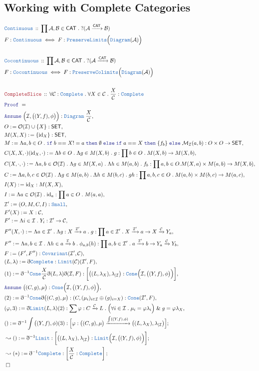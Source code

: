 \documentclass[12pt]{scrartcl}
\newcommand{\TYPE}[1]{\textcolor{NavyBlue}{\mathtt{#1}}}
\newcommand{\LOGIC}[1]{\textcolor{Blue}{\mathtt{#1}}}
\newcommand{\THM}[1]{\textcolor{Maroon}{\mathtt{#1}}}
\renewcommand{\.}{\; . \;}
\newcommand{\de}{: \kern 0.1pc =}
\newcommand{\If}{\LOGIC{if} \;}
\newcommand{\Then}{ \; \LOGIC{then} \;}
\newcommand{\Else}{\; \LOGIC{else} \;}
\newcommand{\Theorem}[2]{& \THM{#1} \, :: \, #2 \\ & \Proof = \\ }
\newcommand{\DeclareType}[2]{& \TYPE{#1} \, :: \, #2 \\}
\newcommand{\DefineType}[3]{& #1 : \TYPE{#2} \iff #3 \\}
\newcommand{\Page}[1]{ \begin{align*} #1 \end{align*}   }
\newcommand{ \bd }{ \ByDef }
\renewcommand{\And}{\; \& \;}
\DeclareMathOperator*{\id}{id}
\newcommand{\Mor}{\mathcal{M}}
\newcommand{\Obj}{\mathcal{O}}
\newcommand{\Arrow}{\xrightarrow}
\newcommand{\Say}[3]{& #1 \de #2 : #3, \\}
\newcommand{\Conclude}[3]{& #1 \de #2 : #3; \\}
\newcommand{\DeriveConclude}[3]{& \leadsto #1 \de #2 : #3 ; \\}
\newcommand{\Assume}[2]{& \LOGIC{Assume} \; #1 : #2, \\}
\newcommand{\QED}{\; \square}
\newcommand{\EndProof}{& \QED \\}
\newcommand{\ByDef}{\eth}
\newcommand{\Proof}{\LOGIC{Proof} \; }
\newcommand{\Cov}{\TYPE{Covariant}}
\newcommand{\C}{\mathcal{C}}
\newcommand{\A}{\mathcal{A}}
\newcommand{\B}{\mathcal{B}}
\newcommand{\I}{\mathcal{I}}
\newcommand{\CAT}{\mathsf{CAT}}
\newcommand{\SET}{\mathsf{SET}}
\begin{document}
\subsection{Working with Complete Categories}
\Page{ 
	\DeclareType{Continuous}{\prod \A,\B \in \CAT \. ?(\A \Arrow{\CAT} \B)}
	\DefineType{ F   }{Continuous}{F : \TYPE{PreserveLimits}\Big( \TYPE{Diagram}(\A)  \Big)}
	\\
	\DeclareType{Cocontinuous}{\prod \A,\B \in \CAT \. ?(\A \Arrow{\CAT} \B)}
	\DefineType{F}{Cocontinuous}{F : \TYPE{PreserveColimits}\Big( \TYPE{Diagram}(\A) \Big)}
	\\
	\Theorem{CompleteSlice}{\forall \C : \TYPE{Complete} \.  \forall X \in \C \.  \frac{X}{\C} : \TYPE{Complete}}
	\Assume{\Big(\I,\big((Y,f),\phi\big)\Big)}{\TYPE{Diagram}\;\frac{X}{\C}}
	\Say{O}{ \Obj(\I) \cup \{X\}}{\SET}
	\Say{M(X,X)}{\{{\id}_X\}}{\SET}
	\Say{M}{ \Lambda a,b \in O \. \If b == X != a  \Then \emptyset \Else \If a == X \Then \{f_b\} \Else \Mor_{\I}(a,b) }
	{ O \times O \to \SET  }
	\Say{C(X,X,\cdot)({\id}_X,\cdot)}{\Lambda b \in O \. \Lambda g \in M(X,b) \. g }{\prod b \in O \.  M(X,b) \to M(X,b)}
	\Say{C(X,\cdot,\cdot)}{\Lambda a,b \in \Obj(\I) \. \Lambda g \in M(X,a) \. \Lambda h \in M(a,b) \.  f_b}
	{\prod a,b \in O . M(X,a) \times M(a,b) \to M(X,b)}
	\Say{C}{\Lambda a,b,c \in \Obj(\I) \. \Lambda g \in M(a,b) \. \Lambda h \in M(b,c) \. gh}
	{\prod a,b,c \in O \. M(a,b) \times M(b,c) \to M(a,c)}
	\Say{I(X)}{{\id}_X}{M(X,X)}
	\Say{I}{ \Lambda a \in \Obj(\I) \.{\id}_a  }{\prod a \in O \. M(a,a)}
	\Say{\I'}{(O,M,C,I)}{\TYPE{Small}}
	\Say{F'(X)}{X}{\C}
	\Say{F'}{\Lambda i \in \I \. Y_i}{\I' \to \C}
	\Say{F''(X,\cdot)}{\Lambda a \in \I' \. \Lambda g : X \Arrow{\I'} a \. g }
	{ \prod a \in \I' \. X \Arrow{\I'} a \to X \Arrow{\C} Y_a   }
	\Say{F''}{\Lambda a,b \in \I \. \Lambda h \in a \Arrow{\I} b \. \phi_{a,b}(h)}
	{\prod a,b \in \I' \. a \Arrow{\I'} b \to Y_a \Arrow{\C} Y_b}
	\Say{F}{(F',F'')}{\Cov(\I',\C)}
	\Say{(L,\lambda)}{\bd \TYPE{Complete}}{\TYPE{Limit}(\C)(\I',F)}
	\Say{(1)}{\bd^{-1}\TYPE{Cone} \frac{X}{\C} \bd(L,\lambda) \bd(\I,F)}
	{\bigg[ \big((L,\lambda_X),\lambda_{|\I}\big) :  \TYPE{Cone}\Big(\I,\big((Y,f),\phi\big)\Big)  \bigg]}
	\Assume{\big((C,g),\mu\big)}{\TYPE{Cone}\Big(\I,\big( (Y,f),\phi\big) \Big)}
	\Say{(2)}{\bd^{-1} \TYPE{Cone} \bd \big((C,g),\mu\big)}
	{(C,(\mu_i)_{i \in \I} \oplus (g)_{i=X} ) : \TYPE{Cone}(\I',F) }
	\Say{(\varphi,3)}{\bd \TYPE{Limit}(L,\lambda)(2)}
	{  \sum \varphi : C \Arrow{\C} L \. 
		\Big(\forall i \in \I \. \mu_i = \varphi \lambda_i \Big) \And g = \varphi \lambda_X   }
	\Conclude{()}{\bd^{-1} \int \big((Y,f),\phi)(3)}{\Big[\varphi : 
		\big((C,g),\mu \big) \Arrow{\int ((Y,f),\phi)} \big((L,\lambda_X),\lambda_{|\I}\big)   \Big]}
	\DeriveConclude{()}{\bd^{-1} \TYPE{Limit}}
	{\bigg[ \big((L,\lambda_X),\lambda_{|\I}\big) : \TYPE{Limit}\Big(\I,\big((Y,f),\phi)\Big) \bigg]}
	\DeriveConclude{(*)}{\bd^{-1} \TYPE{Complete}}{\left[ \frac{X}{\C} : \TYPE{Complete} \right]}
	\EndProof
}
\end{document}
